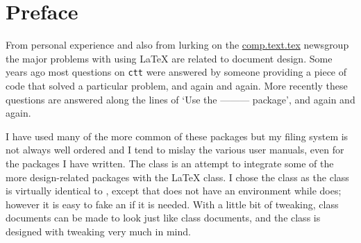 \documentclass[10pt,letterpaper,extrafontsizes]{memoir}
\begin{document}
\vspace*{\fill}

\cleardoublepage

\pagestyle{headings}

\setupshorttoc
\tableofcontents
\clearpage
\setupparasubsecs
\setupmaintoc
\tableofcontents
\setlength{\unitlength}{1pt}
\clearpage
\listoffigures
\clearpage
\listoftables
\clearpage
\listofegresults



\chapter{Preface}

    From personal experience and also from lurking on the \url{comp.text.tex}
newsgroup the major problems with using LaTeX are related to document
design. Some years ago most questions on \texttt{ctt} were answered by
someone providing a piece of code that solved a particular problem, and
again and again. More recently these questions are answered along the
lines of `Use the ---------{} package', and again and again.

    I have used many of the more common of these packages but my filing system
is not always well ordered and I tend to mislay the various user manuals,
even for the packages I have written. The  class is an attempt
to integrate some of the more design-related packages with the LaTeX
 class. I chose the  class as the  class
is virtually identical to , except that  does
not have an  environment while  does; however it is 
easy to fake an  if it is needed. With a little bit of tweaking,
 class documents can be made to look just like 
class documents, and the  class is designed with tweaking very
much in mind.
\end{document}
